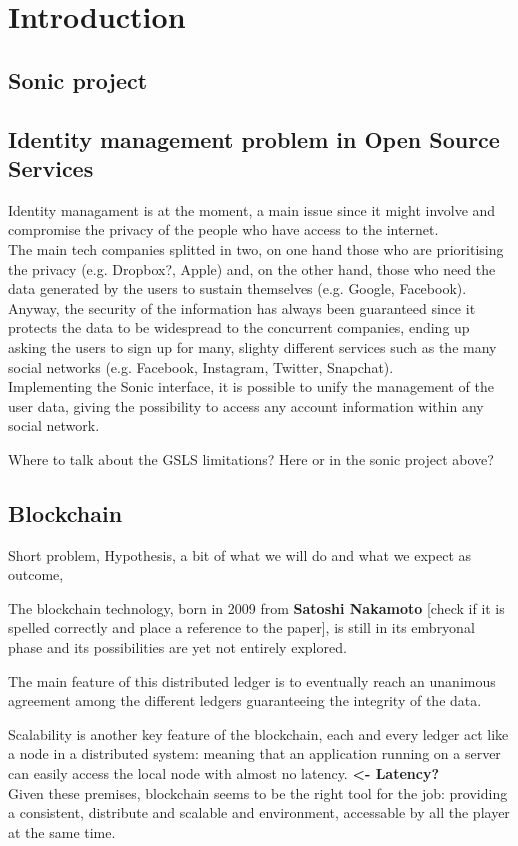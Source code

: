 \section{Introduction}
\label{S:1}

\subsection{Sonic project}

\subsection{Identity management problem in Open Source Services}

Identity managament is at the moment, a main issue since it might involve and compromise the privacy of the people who have access to the internet. 
\\
The main tech companies splitted in two, on one hand those who are prioritising the privacy (e.g. Dropbox?, Apple) and, on the other hand, those who need the data generated by the users to sustain themselves (e.g. Google, Facebook).
\\
Anyway, the security of the information has always been guaranteed since it protects the data to be widespread to the concurrent companies, ending up asking the users to sign up for many, slighty different services such as the many social networks (e.g. Facebook, Instagram, Twitter, Snapchat).
\\
Implementing the Sonic interface, it is possible to unify the management of the user data, giving the possibility to access any account information within any social network.

\begin{answer}
  Where to talk about the GSLS limitations? Here or in the sonic project above?
\end{answer}


\subsection{Blockchain}

Short problem, 
Hypothesis,
a bit of what we will do and what we expect as outcome,

The blockchain technology, born in 2009 from \textbf{Satoshi Nakamoto} [check if it is spelled correctly and place a reference to the paper], is still in its embryonal phase and its possibilities are yet not entirely explored.

The main feature of this distributed ledger is to eventually reach an unanimous agreement among the different ledgers guaranteeing the integrity of the data. 

Scalability is another key feature of the blockchain, each and every ledger act like a node in a distributed system: meaning that an application running on a server can easily access the local node with almost no latency. \textbf{<- Latency? }
\\
Given these premises, blockchain seems to be the right tool for the job: providing a consistent, distribute and scalable and environment, accessable by all the player at the same time.